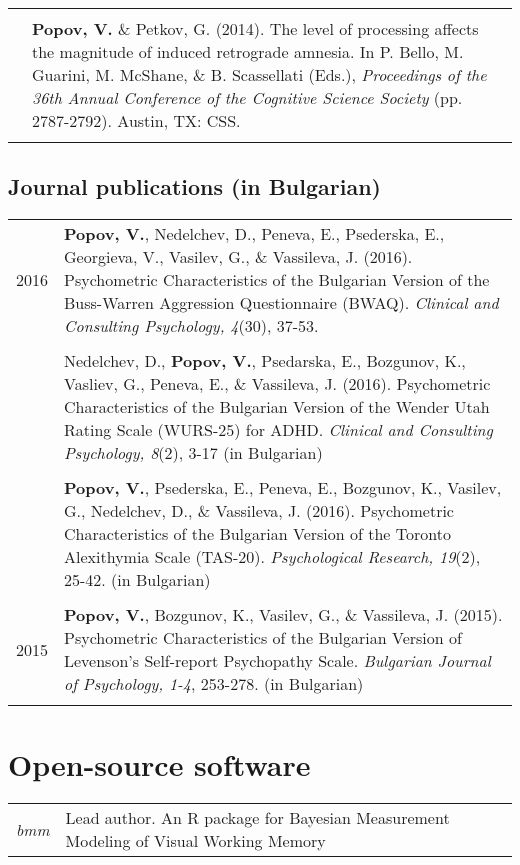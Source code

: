 \documentclass[letterpaper]{article}
\begin{document}
\begin{longtable}{p{0.7cm}p{15cm}}
 &\\
&  	\textbf{Popov, V.} \& Petkov, G. (2014). The level of processing affects the magnitude of induced retrograde amnesia. In P. Bello, M. Guarini, M. McShane, \& B. Scassellati (Eds.), {\it Proceedings of the 36th Annual Conference of the Cognitive Science Society} (pp. 2787-2792). Austin, TX: CSS.\\[18pt]
 &\\
\end{longtable}


\subsection*{Journal publications (in Bulgarian)}
\begin{longtable}{p{0.7cm}p{15cm}}
2016 & \textbf{Popov, V.}, Nedelchev, D., Peneva, E., Psederska, E., Georgieva, V., Vasilev, G., \& Vassileva, J. (2016). Psychometric Characteristics of the Bulgarian Version of the Buss-Warren Aggression Questionnaire (BWAQ). {\it Clinical and Consulting Psychology, 4}(30), 37-53.\\[6pt]
&\\
& Nedelchev, D., \textbf{Popov, V.}, Psedarska, E., Bozgunov, K., Vasliev, G., Peneva, E., \& Vassileva, J. (2016). Psychometric Characteristics of the Bulgarian Version of the Wender Utah Rating Scale (WURS-25) for ADHD. {\it Clinical and Consulting Psychology, 8}(2), 3-17 (in Bulgarian)\\[6pt]
&\\
& \textbf{Popov, V.}, Psederska, E., Peneva, E., Bozgunov, K., Vasilev, G., Nedelchev, D., \& Vassileva, J. (2016). Psychometric Characteristics of the Bulgarian Version of the Toronto Alexithymia Scale (TAS-20). {\it Psychological Research, 19}(2), 25-42. (in Bulgarian)\\[6pt]
 &\\
2015 & \textbf{Popov, V.}, Bozgunov, K., Vasilev, G., \& Vassileva, J. (2015). Psychometric Characteristics of the Bulgarian Version of Levenson's Self-report Psychopathy Scale. {\it Bulgarian Journal of Psychology, 1-4}, 253-278.  (in Bulgarian)\\[6pt]
&\\
\end{longtable}


\section*{Open-source software}
\begin{longtable}{p{0.7cm}p{15cm}}
{\it bmm} & Lead author. An R package for Bayesian Measurement Modeling of Visual Working Memory\\	
\end{longtable}
\end{document}
